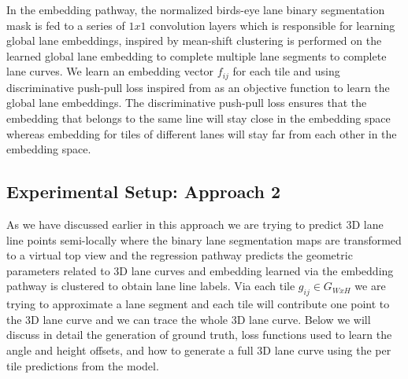      In the embedding pathway, the normalized birds-eye lane binary segmentation mask is fed to a series of $1x1$ convolution layers which is responsible for learning global lane embeddings, inspired by \cite{DBLP:journals/corr/abs-1802-05591} mean-shift clustering is performed on the learned global lane embedding to complete multiple lane segments to complete lane curves. We learn an embedding vector $f_{ij}$ for each tile and using discriminative push-pull loss inspired from \cite{DBLP:journals/corr/abs-2011-01535} \cite{DBLP:journals/corr/abs-1802-05591} as an objective function to learn the global lane embeddings. The discriminative push-pull loss ensures that the embedding that belongs to the same line will stay close in the embedding space whereas embedding for tiles of different lanes will stay far from each other in the embedding space. 

    \subsection{Experimental Setup: Approach 2}
    As we have discussed earlier in this approach we are trying to predict 3D lane line points semi-locally where the binary lane segmentation maps are transformed to a virtual top view and the regression pathway predicts the geometric parameters related to 3D lane curves and embedding learned via the embedding pathway is clustered to obtain lane line labels. Via each tile $g_{ij} \in G_{WxH}$ we are trying to approximate a lane segment and each tile will contribute one point to the 3D lane curve and we can trace the whole 3D lane curve. Below we will discuss in detail the generation of ground truth, loss functions used to learn the angle and height offsets, and how to generate a full 3D lane curve using the per tile predictions from the model. 
